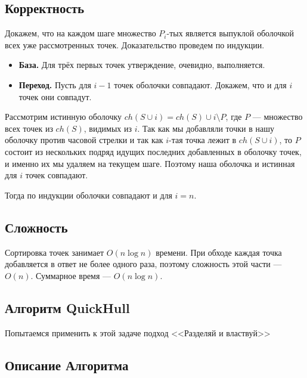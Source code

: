 \subsection*{Корректность}

Докажем, что на каждом шаге множество $P_i$-тых является выпуклой оболочкой всех уже рассмотренных точек. Доказательство проведем по индукции.

\begin{itemize}
	\item \textbf{База.} Для трёх первых точек утверждение, очевидно, выполняется.
	\item \textbf{Переход.} Пусть для $i-1$ точек оболочки совпадают. Докажем, что и для $i$ точек они совпадут.
\end{itemize}

Рассмотрим истинную оболочку $ch(S \cup i) = ch(S) \cup i \setminus P$, где $P$ --- множество всех точек из $ch(S)$, видимых из $i$. Так как мы добавляли точки в нашу оболочку против часовой стрелки и так как $i$-тая точка лежит в $ch(S \cup i)$, то $P$ состоит из нескольких подряд идущих последних добавленных в оболочку точек, и именно их мы удаляем на текущем шаге. Поэтому наша оболочка и истинная для $i$ точек совпадают.

Тогда по индукции оболочки совпадают и для $i = n$.

\subsection*{Сложность}

Сортировка точек занимает $O(n \log n)$ времени. При обходе каждая точка добавляется в ответ не более одного раза, поэтому сложность этой части --- $O(n)$. Суммарное время --- $O(n \log n)$.

\subsection{Алгоритм QuickHull}

Попытаемся применить к этой задаче подход <<Разделяй и властвуй>>

\subsection*{Описание Алгоритма}

